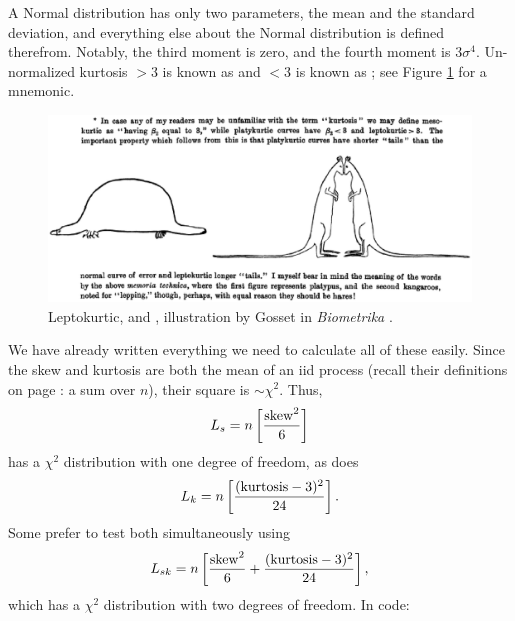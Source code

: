 A Normal distribution has only two parameters, the mean and the
standard deviation, and everything else about the Normal distribution is
defined therefrom. Notably, the third moment is zero, and the fourth
moment is $3 \sigma^4$. 
Un-normalized kurtosis $>3$ is known as  and $<3$ is
known as ; see Figure \ref{tailfig} for a mnemonic.

\begin{figure}[tb]
\hspace{-.3in}\includegraphics[width=\textwidth*\real{1.1}]{kurtosis.eps}
\caption{Leptokurtic,  and , illustration by Gosset in {\em Biometrika} \citep[p 160]{student:errors}. }
\label{tailfig}
\end{figure}


We have already written everything we need to calculate all of these easily.
Since the skew and kurtosis are both the mean of an iid process (recall
their definitions on page \pageref{kurtskew}: a sum over $n$), their
square is $\sim \chi^2$. Thus,
$$L_s = n\left[{{\rm skew}^2\over 6}\right]$$
has a $\chi^2$ distribution with one degree of freedom, as does
$$L_k = n\left[{({\rm kurtosis}-3)^2\over 24}\right].$$
Some prefer to test both simultaneously using
$$L_{sk} = n\left[{{\rm skew}^2\over 6} + {({\rm kurtosis}-3)^2\over 24}\right],$$
which has a $\chi^2$ distribution with two degrees of freedom. In code:

